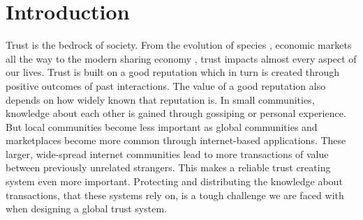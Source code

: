 \chapter{Introduction}
\label{chap:introduction}



Trust is the bedrock of society. From the evolution of species \cite{MOHTASHEMI2003523, nowak2006five, Axelrod1390}, economic markets \cite{akerlof1970lemons} all the way to the 
modern sharing economy \cite{resnick2002trust}, trust impacts almost every aspect of our lives.
Trust is built on a good reputation which in turn is created through positive outcomes of past 
interactions. The value of a good reputation also depends on how widely known that reputation is.
In small communities, knowledge about each other is gained through gossiping or personal experience. 
But local communities become less important as global communities and marketplaces become more common
through internet-based applications. These larger, wide-spread internet communities lead to more
transactions of value between previously unrelated strangers. This makes a reliable trust creating
system even more important. Protecting and distributing the knowledge about transactions, that these 
systems rely on, is a tough challenge we are faced with when designing a global trust system.

